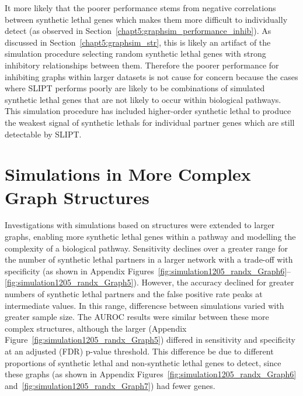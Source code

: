It more likely that the poorer performance stems from negative correlations between \gls{synthetic lethal} genes which makes them more difficult to individually detect (as observed in Section~\ref{chapt5:graphsim_performance_inhib}). As discussed in Section~\ref{chapt5:graphsim_str}, this is likely an artifact of the simulation procedure selecting random \gls{synthetic lethal} genes with strong inhibitory relationships between them. Therefore the poorer performance for inhibiting \glspl{graph} within larger datasets is not cause for concern because the cases where \gls{SLIPT} performs poorly are likely to be combinations of simulated \gls{synthetic lethal} genes that are not likely to occur within biological pathways. This simulation procedure has included higher-order \gls{synthetic lethal} to produce the weakest signal of \glspl{synthetic lethal} for individual partner genes which are still detectable by \gls{SLIPT}.



\FloatBarrier

\section{Simulations in More Complex Graph Structures}
\label{chapt5:complex_graphs}
Investigations with simulations based on  structures were extended to larger \glspl{graph}, enabling more synthetic lethal genes within a pathway and modelling the complexity of a biological pathway. Sensitivity declines over a greater range for the number of \gls{synthetic lethal} partners in a larger network with a trade-off with specificity (as shown in Appendix Figures~\ref{fig:simulation1205_randx_Graph6}\nobreakdash--\ref{fig:simulation1205_randx_Graph5}). However, the accuracy declined for greater numbers of \gls{synthetic lethal} partners and the false positive rate peaks at intermediate values. In this range, differencse between simulations varied with greater sample size. The \gls{AUROC} results were similar between these more complex  structures, although the larger  (Appendix Figure~\ref{fig:simulation1205_randx_Graph5}) differed in sensitivity and specificity at an adjusted (\gls{FDR}) p-value threshold. This difference be due to different proportions of \gls{synthetic lethal} and non-synthetic lethal genes to detect, since these \glspl{graph} (as shown in Appendix Figures~\ref{fig:simulation1205_randx_Graph6} and~\ref{fig:simulation1205_randx_Graph7}) had fewer genes. %

